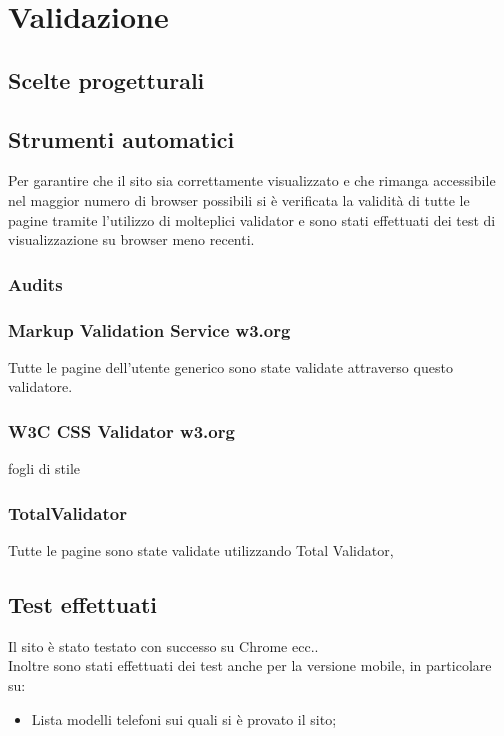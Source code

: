 \newpage
\section{Validazione}
 

\subsection{Scelte progetturali}

\subsection{Strumenti automatici}
Per garantire che il sito sia correttamente visualizzato e che rimanga accessibile nel maggior numero di browser possibili si è verificata la validità di tutte le pagine tramite l'utilizzo di molteplici validator e sono stati effettuati dei test di visualizzazione su browser meno recenti.


\subsubsection{Audits}

\subsubsection{Markup Validation Service w3.org}
Tutte le pagine dell'utente generico sono state validate attraverso questo validatore. 

\subsubsection{W3C CSS Validator w3.org}
fogli di stile 

\subsubsection{TotalValidator}
Tutte le pagine sono state validate utilizzando Total Validator, 


\subsection{Test effettuati}
Il sito è stato testato con successo su Chrome ecc.. 
\\Inoltre sono stati effettuati dei test anche per la versione mobile, in particolare su:
\begin{itemize}
	\item Lista modelli telefoni sui quali si è provato il sito;
\end{itemize}
